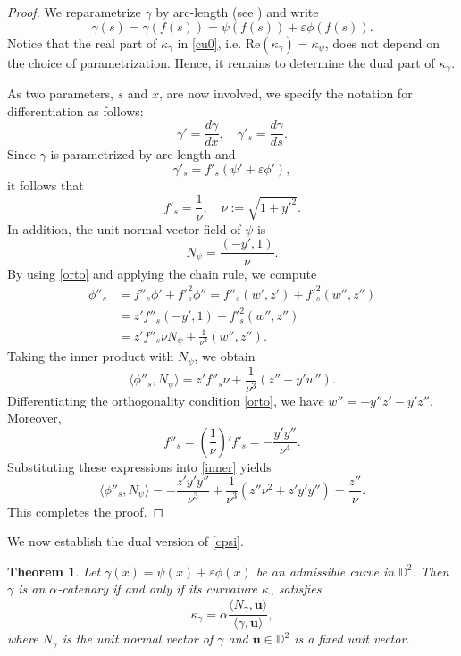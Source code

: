 \documentclass[a4paper,12pt]{amsart}
\newtheorem{theorem}{Theorem}[section]
\theoremstyle{definition}
\def\d{\mathsf d}
\def\d{\mathbb D}
\begin{document}
\begin{proof}
We reparametrize $\gamma$ by arc-length (see \cite[Proposition 2.1]{lo}) and write
$$\gamma(s)=\gamma(f(s))=\psi(f(s))+\varepsilon \phi(f(s)).$$
Notice that the real part of $\kappa_\gamma$ in \eqref{cu0}, i.e. $\mbox{Re}(\kappa_\gamma)=\kappa_\psi $, does not depend on the choice of parametrization. Hence, it remains to determine the dual part of $\kappa_\gamma$. 

As two parameters, $s$ and $x$, are now involved,  we specify the notation for differentiation as follows:
$$
\gamma'=\frac{d\gamma}{dx}, \quad \gamma'_s=\frac{d\gamma}{ds}.
$$ 
Since $\gamma$ is parametrized by arc-length and 
$$\gamma'_s=f'_s(\psi'+\varepsilon \phi'),$$
it follows that
$$f'_s=\frac{1}{\nu},\quad \nu:=\sqrt{1+y'^2}.$$
In addition, the unit normal vector field of $\psi$ is 
$$N_\psi=\frac{(-y',1)}{\nu}.$$
By using \eqref{orto} and applying the chain rule, we compute
\begin{equation*}
\begin{split}
\phi''_s&=f''_s\phi'+f'^2_s\phi''=f''_s(w',z')+f'^2_s(w'',z'')\\
&=z'f''_s(-y',1)+f'^2_s(w'',z'')\\
&=z'f''_s\nu N_\psi+\frac{1}{\nu^2}(w'',z'').
\end{split}
\end{equation*}
Taking the inner product with $N_\psi$, we obtain
\begin{equation}\label{inner}
\langle\phi''_s,N_\psi\rangle=z'f''_s\nu+\frac{1}{\nu^3}(z''-y'w'').
\end{equation}
Differentiating the orthogonality condition \eqref{orto}, we have $w''=-y''z'-y'z''$. Moreover, 
$$f''_s=\left(\frac{1}{\nu}\right)'f'_s=-\frac{y'y''}{\nu^4}.$$
Substituting these expressions into \eqref{inner} yields
$$\langle\phi''_s,N_\psi\rangle=-\frac{z'y'y''}{\nu^3}+\frac{1}{\nu^3}(z''\nu^2 +z'y'y'')=\frac{z''}{\nu}.$$
This completes the proof.
\end{proof}

We now establish the dual version of \eqref{cpsi}. 

\begin{theorem}\label{t32}
Let $\gamma(x)=\psi(x)+\varepsilon \phi(x)$ be an admissible curve in $\d^2$. Then $\gamma$ is an $\alpha$-catenary if and only if
its curvature $\kappa_\gamma$ satisfies
\begin{equation}\label{chara}
  \kappa_\gamma=\alpha \frac{\langle N_\gamma,\mathbf{u}\rangle}{\langle \gamma,\mathbf{u}\rangle},
\end{equation}
where $N_\gamma$ is the unit normal vector of $\gamma$ and $\mathbf{u}\in \d^2$ is a fixed unit vector.
\end{theorem}
\end{document}
